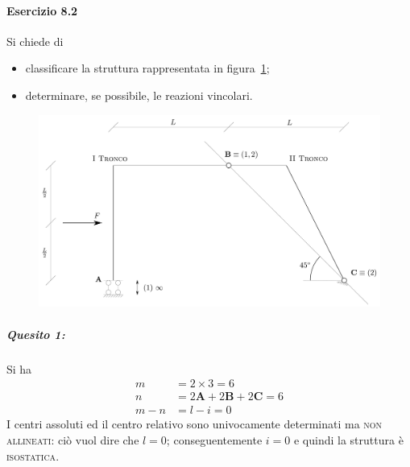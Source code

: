 \paragraph{Esercizio 8.2}
Si chiede di
\begin{itemize}
\item classificare la struttura rappresentata in figura~\ref{Esercizio8-2-1}; 
\item determinare, se possibile, le reazioni vincolari.
\end{itemize}
\renewcommand{\thefigure}{8.2~-~1}
\begin{figure}[ht]
\centering
\includegraphics[width=\textwidth]{Immagini/Parte_8/Esercizio8_2/Esercizio8_2_1.pdf}
\caption{}
\label{Esercizio8-2-1}
\end{figure}
\noindent \subparagraph{Quesito 1:}
Si ha 
\begin{align*}
m    &= 2\times 3 = 6 \\ 
n     &= 2\mathbf{A}+2\mathbf{B}+2\mathbf{C} = 6 \\
m-n &= l-i = 0  
\end{align*}
I centri assoluti ed il centro relativo sono univocamente determinati ma \textsc{non allineati}: ciò vuol dire che $l=0$; conseguentemente $i=0$ e quindi la struttura è \textsc{isostatica}. 
